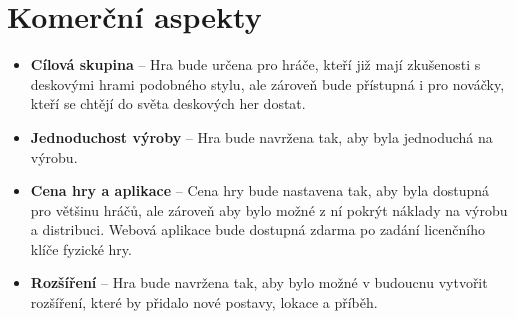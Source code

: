 \section{Komerční aspekty}
\label{sec:req_commercial}

\begin{itemize}
    \item \textbf{Cílová skupina} --
        Hra bude určena pro hráče, kteří již mají zkušenosti s deskovými hrami podobného stylu, ale zároveň bude přístupná i pro nováčky, kteří se chtějí do světa deskových her dostat.
    \item \textbf{Jednoduchost výroby} --
        Hra bude navržena tak, aby byla jednoduchá na výrobu.
    \item \textbf{Cena hry a aplikace} --
        Cena hry bude nastavena tak, aby byla dostupná pro většinu hráčů, ale zároveň aby bylo možné z ní pokrýt náklady na výrobu a distribuci. Webová aplikace bude dostupná zdarma po zadání licenčního klíče fyzické hry.
    \item \textbf{Rozšíření} --
        Hra bude navržena tak, aby bylo možné v budoucnu vytvořit rozšíření, které by přidalo nové postavy, lokace a příběh.
\end{itemize}